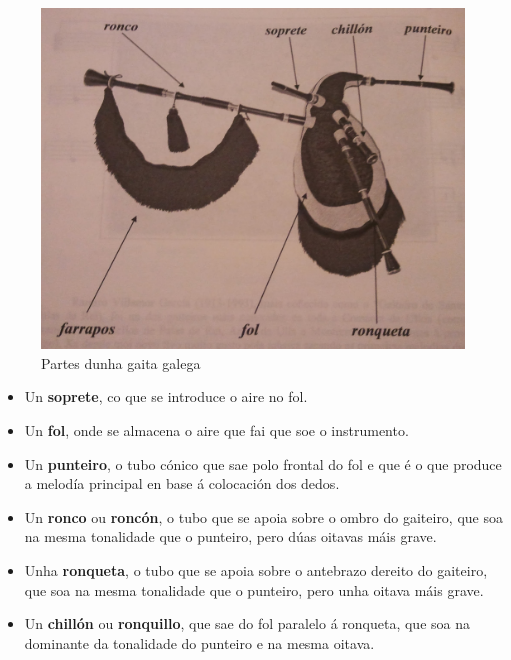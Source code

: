  \begin{figure}[htbp]
  \centering
  \includegraphics[scale=0.1,keepaspectratio=true]{./imagenes/bruno-villamor-partes-gaita-galega.jpg}
  \caption[Partes dunha gaita galega]{Partes dunha gaita galega \cite{BrunoVillamorCaderno15}}
  \label{figura:BrunoVillamorPartesGaitaGalega}
 \end{figure}

 \begin{itemize}
  \item Un \textbf{soprete}, co que se introduce o aire no fol.
  \item Un \textbf{fol}, onde se almacena o aire que fai que soe o instrumento.
  \item Un \textbf{punteiro}, o tubo cónico que sae polo frontal do fol e que é
        o que produce a melodía principal en base á colocación dos dedos.
  \item Un \textbf{ronco} ou \textbf{roncón}, o tubo que se apoia sobre o ombro
        do gaiteiro, que soa na mesma tonalidade que o punteiro, pero dúas
        oitavas máis grave.
  \item Unha \textbf{ronqueta}, o tubo que se apoia sobre o antebrazo dereito
        do gaiteiro, que soa na mesma tonalidade que o punteiro, pero unha
        oitava máis grave.
  \item Un \textbf{chillón} ou \textbf{ronquillo}, que sae do fol paralelo á
        ronqueta, que soa na dominante da tonalidade do punteiro e na mesma
        oitava.
 \end{itemize}

